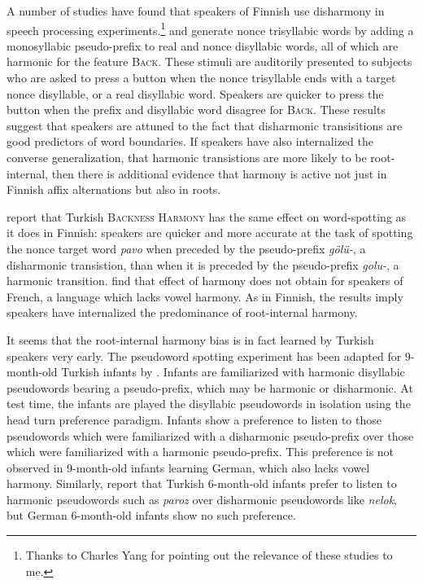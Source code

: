 A number of studies have found that speakers of Finnish use disharmony in speech processing experiments.\footnote{Thanks to Charles Yang for pointing out the relevance of these studies to me.} \citet{Suomi1997} and \citet{Vroomen1998} generate nonce trisyllabic words by adding a monosyllabic pseudo-prefix to real and nonce disyllabic words, all of which are harmonic for the feature \textsc{Back}. These stimuli are auditorily presented to subjects who are asked to press a button when the nonce trisyllable ends with a target nonce disyllable, or a real disyllabic word. Speakers are quicker to press the button when the prefix and disyllabic word disagree for \textsc{Back}. These results suggest that speakers are attuned to the fact that disharmonic transisitions are good predictors of word boundaries. If speakers have also internalized the converse generalization, that harmonic transistions are more likely to be root-internal, then there is additional evidence that harmony is active not just in Finnish affix alternations but also in roots. 

\citet{Kabak2010} report that Turkish \textsc{Backness Harmony} has the same effect on word-spotting as it does in Finnish: speakers are quicker and more accurate at the task of spotting the nonce target word \emph{pavo} when preceded by the pseudo-prefix \emph{gölü-}, a disharmonic transistion, than when it is preceded by the pseudo-prefix \emph{golu-}, a harmonic transition. \citeauthor{Kabak2010} find that effect of harmony does not obtain for speakers of French, a language which lacks vowel harmony. As in Finnish, the results imply speakers have internalized the predominance of root-internal harmony.

It seems that the root-internal harmony bias is in fact learned by Turkish speakers very early. The pseudoword spotting experiment has been adapted for 9-month-old Turkish infants by \citet{Kampen2008}. Infants are familiarized with harmonic disyllabic pseudowords bearing a pseudo-prefix, which may be harmonic or disharmonic. At test time, the infants are played the disyllabic pseudowords in isolation using the head turn preference paradigm. Infants show a preference to listen to those pseudowords which were familiarized with a disharmonic pseudo-prefix over those which were familiarized with a harmonic pseudo-prefix. This preference is not observed in 9-month-old infants learning German, which also lacks vowel harmony. Similarly, \citeauthor{Kampen2008} report that Turkish 6-month-old infants prefer to listen to harmonic pseudowords such as \emph{paroz} over disharmonic pseudowords like \emph{nelok}, but German 6-month-old infants show no such preference.
